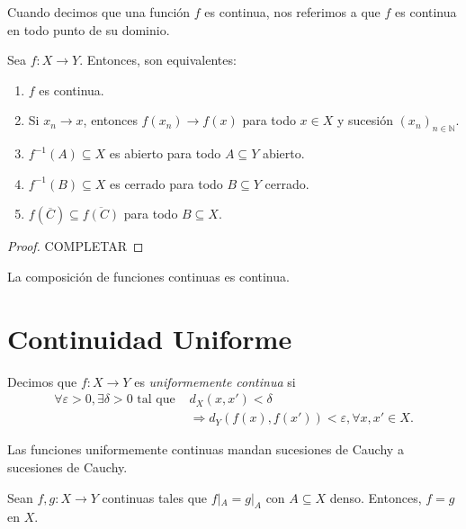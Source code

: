 Cuando decimos que una función $f$ es continua, nos referimos a que $f$ es continua en todo punto de su dominio.

\begin{proposition}
	Sea $f : X \to Y$. Entonces, son equivalentes:
	\begin{enumerate}
		\item $f$ es continua.
		\item Si $x_n \longrightarrow x$, entonces $f(x_n) \longrightarrow f(x)$ para todo $x \in X$ y sucesión $(x_n)_{n \in \mathbb{N}}$.
		\item $f^{-1} (A) \subseteq X$ es abierto para todo $A \subseteq Y$ abierto.
		\item $f^{-1} (B) \subseteq X$ es cerrado para todo $B \subseteq Y$ cerrado.
		\item $f( \overline{C} ) \subseteq \overline{f(C)}$ para todo $B \subseteq X$.
	\end{enumerate}
\end{proposition}

\begin{proof}
	\color{red} COMPLETAR
\end{proof}

\begin{proposition}
	La composición de funciones continuas es continua.
\end{proposition}

\section{Continuidad Uniforme}

\begin{definition}
	Decimos que $f : X \to Y$ es \emph{uniformemente continua} si
	\begin{equation*}
		\begin{split}
			\forall \varepsilon > 0, \exists \delta > 0 \text{ tal que } & d_X(x,x') < \delta \\ &\Rightarrow d_Y(f(x), f(x')) < \varepsilon, \forall x, x' \in X.
		\end{split}
	\end{equation*}
\end{definition}

\begin{remark}
	Las funciones uniformemente continuas mandan sucesiones de Cauchy a sucesiones de Cauchy.
\end{remark}

\begin{proposition}
	Sean $f, g : X \to Y$ continuas tales que $f |_A = g|_A$ con $A \subseteq X$ denso. Entonces, $f = g$ en $X$.
\end{proposition}

